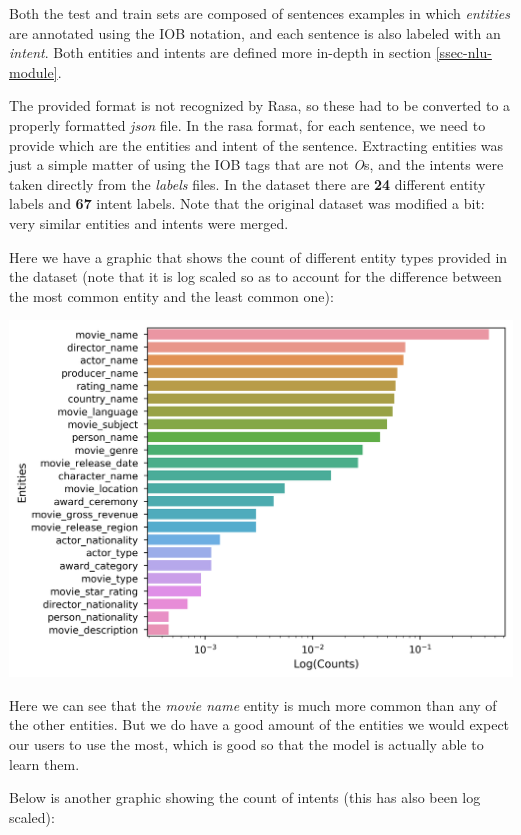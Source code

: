 \documentclass[11pt,a4paper]{article}
\newcommand{\mnintentlabels}{67}
\newcommand{\mnentitylabels}{24}
\begin{document}
		Both the test and train sets are composed of sentences examples in which \textit{entities} are annotated using the IOB notation, and each sentence is also labeled with an \textit{intent}. Both entities and intents are defined more in-depth in section \ref{ssec-nlu-module}.
	
		The provided format is not recognized by Rasa, so these had to be converted to a properly formatted \textit{json} file. In the rasa format, for each sentence, we need to provide which are the entities and intent of the sentence. Extracting entities was just a simple matter of using the IOB tags that are not \textit{O}s, and the intents were taken directly from the \textit{labels} files. In the dataset there are \textbf{\mnentitylabels} different entity labels and \textbf{\mnintentlabels} intent labels. Note that the original dataset was modified a bit: very similar entities and intents were merged.
		
		Here we have a graphic that shows the count of different entity types provided in the dataset (note that it is log scaled so as to account for the difference between the most common entity and the least common one):
		
		\hspace*{-0.4cm}\includegraphics[scale=0.5]{entities_frequency}
		
		Here we can see that the \textit{movie name} entity is much more common than any of the other entities. But we do have a good amount of the entities we would expect our users to use the most, which is good so that the model is actually able to learn them.  
		
		Below is another graphic showing the count of intents (this has also been log scaled):
		
\end{document}
